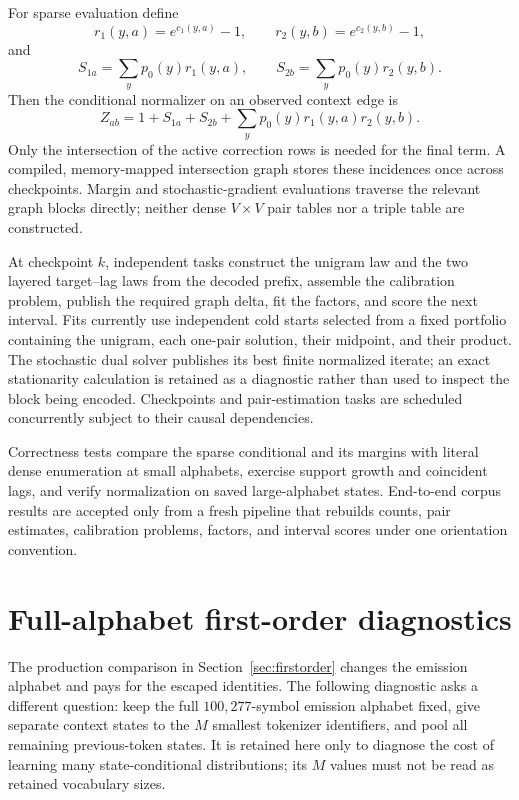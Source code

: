\documentclass[11pt]{article}
\begin{document}
For sparse evaluation define
\[
 r_1(y,a)=e^{c_1(y,a)}-1,
 \qquad r_2(y,b)=e^{c_2(y,b)}-1,
\]
and
\[
 S_{1a}=\sum_y p_0(y)r_1(y,a),
 \qquad S_{2b}=\sum_y p_0(y)r_2(y,b).
\]
Then the conditional normalizer on an observed context edge is
\[
 Z_{ab}=1+S_{1a}+S_{2b}
       +\sum_y p_0(y)r_1(y,a)r_2(y,b).
\]
Only the intersection of the active correction rows is needed for the final
term.  A compiled, memory-mapped intersection graph stores these incidences
once across checkpoints.  Margin and stochastic-gradient evaluations traverse
the relevant graph blocks directly; neither dense $V\times V$ pair tables nor
a triple table are constructed.

At checkpoint $k$, independent tasks construct the unigram law and the two
layered target--lag laws from the decoded prefix, assemble the calibration
problem, publish the required graph delta, fit the factors, and score the next
interval.  Fits currently use independent cold starts selected from a fixed
portfolio containing the unigram, each one-pair solution, their midpoint, and
their product.  The stochastic dual solver publishes its best finite
normalized iterate; an exact stationarity calculation is retained as a
diagnostic rather than used to inspect the block being encoded.  Checkpoints
and pair-estimation tasks are scheduled concurrently subject to their causal
dependencies.

Correctness tests compare the sparse conditional and its margins with literal
dense enumeration at small alphabets, exercise support growth and coincident
lags, and verify normalization on saved large-alphabet states.  End-to-end
corpus results are accepted only from a fresh pipeline that rebuilds counts,
pair estimates, calibration problems, factors, and interval scores under one
orientation convention.

\section{Full-alphabet first-order diagnostics}
\label{app:firstorder-diagnostics}

The production comparison in Section~\ref{sec:firstorder} changes the
emission alphabet and pays for the escaped identities.  The following
diagnostic asks a different question: keep the full $100{,}277$-symbol
emission alphabet fixed, give separate context states to the $M$ smallest
tokenizer identifiers, and pool all remaining previous-token states.  It is
retained here only to diagnose the cost of learning many state-conditional
distributions; its $M$ values must not be read as retained vocabulary sizes.
\end{document}
